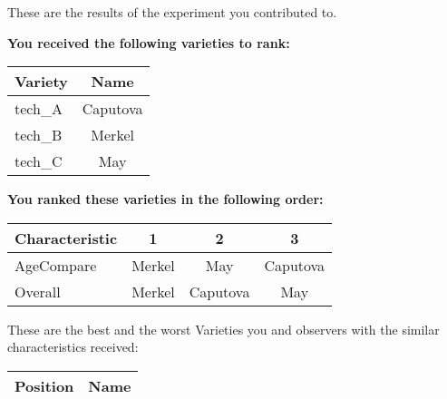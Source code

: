 \documentclass[10pt]{article}
\begin{document}
\begin{titlepage}
	These are the results of the experiment you contributed to.

	\begin{flushleft}
		\textbf{You received the following varieties to rank: }\hfill \break
		\begin{tabularx}{\textwidth}{ X | c  }
			\hline
			\textbf{Variety} & \textbf{Name} \\ \hline

			
				tech\_A & Caputova \\ \hline
			
				tech\_B & Merkel \\ \hline
			
				tech\_C & May \\ \hline
			


		\end{tabularx}\newline \newline

		\textbf{You ranked these varieties in the following order: }\hfill \break
		\begin{tabularx}{\textwidth}{ X | c | c | c  }
			\hline
			\textbf{Characteristic}
			
				& \textbf{ 1 }
			
				& \textbf{ 2 }
			
				& \textbf{ 3 }
			
			\\ \hline


			
				AgeCompare & Merkel  & May  & Caputova  \\ \hline


			
				Overall & Merkel  & Caputova  & May  \\ \hline


			

		\end{tabularx}

	\end{flushleft}

	\pagebreak

	\begin{flushleft}
		These are the best and the worst Varieties you and observers with the similar characteristics received:\hfill \break \newline
		\begin{tabularx}{\textwidth}{ X | X  }
			\hline
			\textbf{Position} & \textbf{Name} \\ \hline


\end{tabularx}
\end{flushleft}
\end{titlepage}
\end{document}

